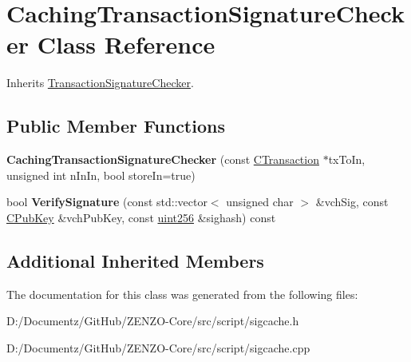 \hypertarget{class_caching_transaction_signature_checker}{}\section{Caching\+Transaction\+Signature\+Checker Class Reference}
\label{class_caching_transaction_signature_checker}


Inherits \mbox{\hyperlink{class_transaction_signature_checker}{Transaction\+Signature\+Checker}}.

\subsection*{Public Member Functions}
\begin{DoxyCompactItemize}
\item 
\mbox{\label{class_caching_transaction_signature_checker_a43369b09574bd1ac6327b7933c030c4f}} 
{\bfseries Caching\+Transaction\+Signature\+Checker} (const \mbox{\hyperlink{class_c_transaction}{C\+Transaction}} $\ast$tx\+To\+In, unsigned int n\+In\+In, bool store\+In=true)
\item 
\mbox{\label{class_caching_transaction_signature_checker_a8fb5c049a2f0ef3d4d3fbfeea88b7b53}} 
bool {\bfseries Verify\+Signature} (const std\+::vector$<$ unsigned char $>$ \&vch\+Sig, const \mbox{\hyperlink{class_c_pub_key}{C\+Pub\+Key}} \&vch\+Pub\+Key, const \mbox{\hyperlink{classuint256}{uint256}} \&sighash) const
\end{DoxyCompactItemize}
\subsection*{Additional Inherited Members}


The documentation for this class was generated from the following files\+:\begin{DoxyCompactItemize}
\item 
D\+:/\+Documentz/\+Git\+Hub/\+Z\+E\+N\+Z\+O-\/\+Core/src/script/sigcache.\+h\item 
D\+:/\+Documentz/\+Git\+Hub/\+Z\+E\+N\+Z\+O-\/\+Core/src/script/sigcache.\+cpp\end{DoxyCompactItemize}
